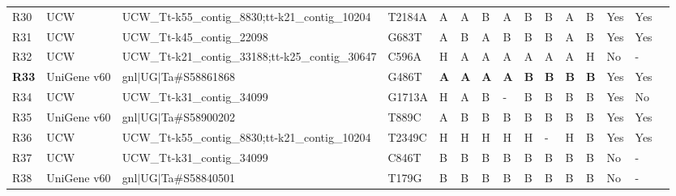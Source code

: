 \begin{sidewaystable}
\begin{localsize}{6}{9}
\begin{tabular}{llllllll!{\extracolsep{4pt}}lllllll}
 R30        & UCW         & UCW\_Tt-k55\_contig\_8830;tt-k21\_contig\_10204                      & T2184A & A      & A         & B        & A        & B            & B         & A         & B     & Yes           & Yes                    &                         \\
 R31        & UCW         & UCW\_Tt-k45\_contig\_22098                                         & G683T  & A      & B         & A        & B        & B            & B         & A         & B     & Yes           & Yes                    &                         \\
 R32        & UCW         & UCW\_Tt-k21\_contig\_33188;tt-k25\_contig\_30647                     & C596A  & H      & A         & A        & A        & A            & A         & A         & H     & No            & -                      &                         \\
 \textbf{R33}        & UniGene v60 & gnl$|$UG$|$Ta\#S58861868                                             & G486T  & \textbf{A}      & \textbf{A}         & \textbf{A}        & \textbf{A}        & \textbf{B}            & \textbf{B}         & \textbf{B}         & \textbf{B}     & Yes           & Yes                    &                         \\
 R34        & UCW         & UCW\_Tt-k31\_contig\_34099                                         & G1713A & H      & A         & B        & -        & B            & B         & B         & B     & Yes           & No                     &                         \\
 R35        & UniGene v60 & gnl$|$UG$|$Ta\#S58900202                                             & T889C  & A      & B         & B        & B        & B            & B         & B         & B     & Yes           & Yes                    &                         \\
 R36        & UCW         & UCW\_Tt-k55\_contig\_8830;tt-k21\_contig\_10204                      & T2349C & H      & H         & H        & H        & H            & -         & H         & B     & Yes           & Yes                    &                         \\
 R37        & UCW         & UCW\_Tt-k31\_contig\_34099                                         & C846T  & B      & B         & B        & B        & B            & B         & B         & B     & No            & -                      &                         \\
 R38        & UniGene v60 & gnl$|$UG$|$Ta\#S58840501                                             & T179G  & B      & B         & B        & B        & B            & B         & B         & B     & No            & -                      &                         \\

\end{tabular}
\end{localsize}
\end{sidewaystable}
